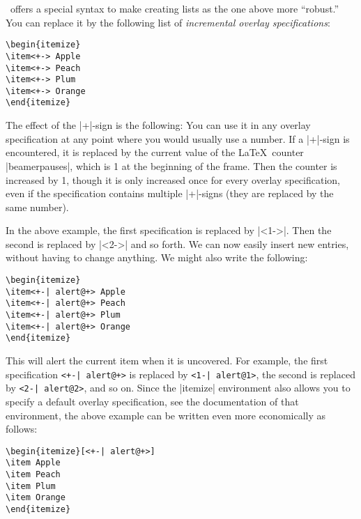 \beamer\ offers a special syntax to make creating lists as the one
above more ``robust.'' You can replace it by the following list of
\emph{incremental overlay specifications}:
\begin{verbatim}
\begin{itemize}
\item<+-> Apple
\item<+-> Peach
\item<+-> Plum
\item<+-> Orange
\end{itemize}
\end{verbatim}
The effect of the |+|-sign is the following: You can use it in any
overlay specification at any point where you would usually use a
number. If a |+|-sign is encountered, it is replaced by the current
value of the \LaTeX\ counter |beamerpauses|, which is 1 at the
beginning of the frame. Then the counter is increased by 1, though it
is only increased once for every overlay specification, even if the
specification contains multiple |+|-signs (they are replaced by the
same number).

In the above example, the first specification is replaced by
|<1->|. Then the second is replaced by |<2->| and so forth. We can now
easily insert new entries, without having to change anything. We might
also write the following:
\begin{verbatim}
\begin{itemize}
\item<+-| alert@+> Apple
\item<+-| alert@+> Peach
\item<+-| alert@+> Plum
\item<+-| alert@+> Orange
\end{itemize}
\end{verbatim}
This will alert the current item when it is uncovered. For example,
the first specification \verb/<+-| alert@+>/ is replaced by
\verb/<1-| alert@1>/, the second is replaced by \verb/<2-| alert@2>/, and so on.
Since the |itemize| environment also allows you to specify a default
overlay specification, see the documentation of that environment, the
above example can be written even more economically as follows:
\begin{verbatim}
\begin{itemize}[<+-| alert@+>]
\item Apple
\item Peach
\item Plum
\item Orange
\end{itemize}
\end{verbatim}

